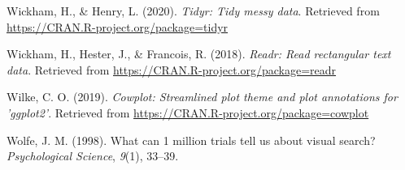 \documentclass[
  english,
  man]{apa6}
\begin{document}
\leavevmode\hypertarget{ref-R-tidyr}{}%
Wickham, H., \& Henry, L. (2020). \emph{Tidyr: Tidy messy data}. Retrieved from \url{https://CRAN.R-project.org/package=tidyr}

\leavevmode\hypertarget{ref-R-readr}{}%
Wickham, H., Hester, J., \& Francois, R. (2018). \emph{Readr: Read rectangular text data}. Retrieved from \url{https://CRAN.R-project.org/package=readr}

\leavevmode\hypertarget{ref-R-cowplot}{}%
Wilke, C. O. (2019). \emph{Cowplot: Streamlined plot theme and plot annotations for 'ggplot2'}. Retrieved from \url{https://CRAN.R-project.org/package=cowplot}

\leavevmode\hypertarget{ref-wolfe1998can}{}%
Wolfe, J. M. (1998). What can 1 million trials tell us about visual search? \emph{Psychological Science}, \emph{9}(1), 33--39.

\endgroup
\end{document}
